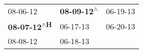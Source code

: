 \begin{supertabular}{lll}
                   08-06-12\textsuperscript{} &  \textbf{08-09-12\textsuperscript{$\wedge$}} &  06-19-13\textsuperscript{} \\
 \textbf{08-07-12\textsuperscript{$\wedge$H}} &                   06-17-13\textsuperscript{} &  06-20-13\textsuperscript{} \\
                   08-08-12\textsuperscript{} &                   06-18-13\textsuperscript{} &                             \\
\end{supertabular}
